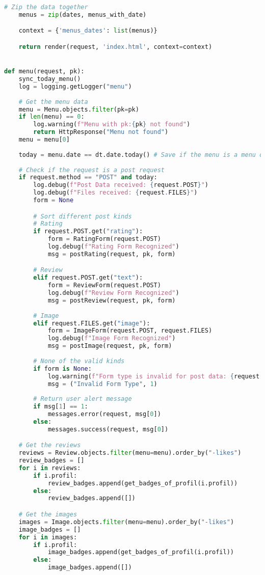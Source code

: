 \begin{lstlisting}[language=Python]
    # Zip the data together
    menus = zip(dates, menus_with_date)

    context = {'menus_dates': list(menus)}

    return render(request, 'index.html', context=context)


def menu(request, pk):
    sync_today_menu()
    log = logging.getLogger("menu")
    
    # Get the menu data
    menu = Menu.objects.filter(pk=pk)
    if len(menu) == 0:
        log.warning(f"Menu with pk:{pk} not found")
        return HttpResponse("Menu not found")
    menu = menu[0]
    
    today = menu.date == dt.date.today() # Save if the menu is a menu of today
    
    # Check if the request is a post request
    if request.method == "POST" and today:
        log.debug(f"Post Data received: {request.POST}")
        log.debug(f"Files received: {request.FILES}")
        form = None

        # Sort different post kinds
        # Rating
        if request.POST.get("rating"):
            form = RatingForm(request.POST)
            log.debug(f"Rating Form Recognized")
            msg = postRating(request, pk, form)

        # Review
        elif request.POST.get("text"):
            form = ReviewForm(request.POST)
            log.debug(f"Review Form Recognized")
            msg = postReview(request, pk, form)
        
        # Image
        elif request.FILES.get("image"):
            form = ImageForm(request.POST, request.FILES)
            log.debug(f"Image Form Recognized")
            msg = postImage(request, pk, form)
        
        # None of the valid kinds
        if form is None:
            log.warning(f"Form type is invalid for post data: {request.POST}")
            msg = ("Invalid Form Type", 1)
        
        # Return user alert message
        if msg[1] == 1:
            messages.error(request, msg[0])
        else:
            messages.success(request, msg[0])

    # Get the reviews
    reviews = Review.objects.filter(menu=menu).order_by("-likes")
    review_badges = []
    for i in reviews:
        if i.profil:
            review_badges.append(get_badges_of_profil(i.profil))
        else:
            review_badges.append([])

    # Get the images
    images = Image.objects.filter(menu=menu).order_by("-likes")
    image_badges = []
    for i in images:
        if i.profil:
            image_badges.append(get_badges_of_profil(i.profil))
        else:
            image_badges.append([])
    

\end{lstlisting}
